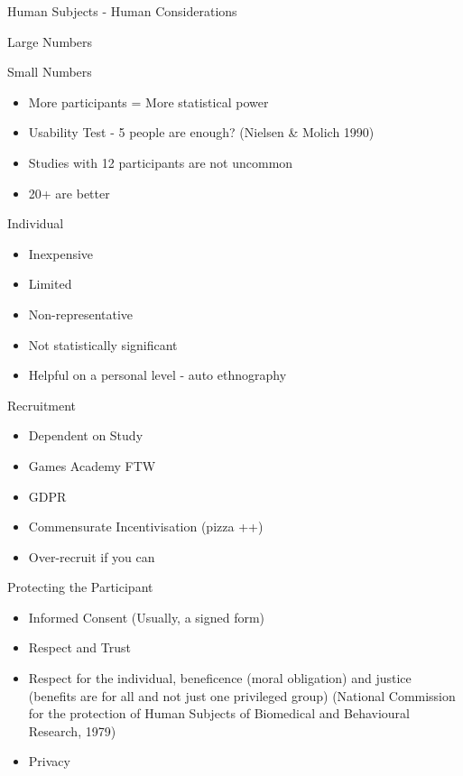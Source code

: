\documentclass[ignorenonframetext,]{beamer}
\providecommand{\tightlist}{%
  \setlength{\itemsep}{0pt}\setlength{\parskip}{0pt}}
\begin{document}
\begin{frame}{Human Subjects - Human Considerations}
\begin{block}{Large Numbers}
\end{block}

\begin{block}{Small Numbers}

\begin{itemize}
\tightlist
\item
  More participants = More statistical power
\item
  Usability Test - 5 people are enough? (Nielsen \& Molich 1990)
\item
  Studies with 12 participants are not uncommon
\item
  20+ are better
\end{itemize}

\end{block}

\begin{block}{Individual}

\begin{itemize}
\tightlist
\item
  Inexpensive
\item
  Limited
\item
  Non-representative
\item
  Not statistically significant
\item
  Helpful on a personal level - auto ethnography
\end{itemize}

\end{block}

\begin{block}{Recruitment}

\begin{itemize}
\tightlist
\item
  Dependent on Study
\item
  Games Academy FTW
\item
  GDPR
\item
  Commensurate Incentivisation (pizza ++)
\item
  Over-recruit if you can
\end{itemize}

\end{block}

\begin{block}{Protecting the Participant}

\begin{itemize}
\item
  Informed Consent (Usually, a signed form)
\item
  Respect and Trust
\item
  Respect for the individual, beneficence (moral obligation) and justice
  (benefits are for all and not just one privileged group) (National
  Commission for the protection of Human Subjects of Biomedical and
  Behavioural Research, 1979)
\item
  Privacy


\end{itemize}
\end{block}
\end{frame}
\end{document}
